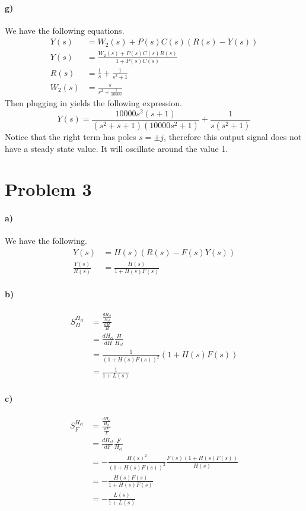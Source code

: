 \documentclass[12pt]{article}
\begin{document}
\paragraph{g)}

We have the following equations.
\begin{align*}
    Y(s)&=W_2(s)+P(s)C(s)(R(s)-Y(s))\\
    Y(s)&=\frac{W_2(s)+P(s)C(s)R(s)}{1+P(s)C(s)}\\
    R(s)&=\frac{1}{s}+\frac{1}{s^2+1}\\
    W_2(s)&=\frac{s}{s^2+\frac{1}{10000}}
\end{align*}
Then plugging in yields the following expression.
\[Y(s)=\frac{10000s^2(s+1)}{(s^2+s+1)(10000s^2+1)} + \frac{1}{s(s^2+1)}\]
Notice that the right term has poles \(s=\pm j\), therefore this output signal does
not have a steady state value. It will oscillate around the value 1.

\section*{Problem 3}

\paragraph{a)}

We have the following.
\begin{align*}
    Y(s)&=H(s)(R(s)-F(s)Y(s))\\
    \frac{Y(s)}{R(s)}&=\frac{H(s)}{1+H(s)F(s)}
\end{align*}

\paragraph{b)}

\begin{align*}
    S_H^{H_{cl}}&=\frac{\frac{dH_{cl}}{H_{cl}}}{\frac{dH}{H}}\\
    &=\frac{dH_{cl}}{dH}\frac{H}{H_{cl}}\\
    &=\frac{1}{(1+H(s)F(s))^2}(1+H(s)F(s))\\
    &=\frac{1}{1+L(s)}
\end{align*}

\paragraph{c)}

\begin{align*}
    S_F^{H_{cl}}&=\frac{\frac{dH_{cl}}{H_{cl}}}{\frac{dF}{F}}\\
    &=\frac{dH_{cl}}{dF}\frac{F}{H_{cl}}\\
    &=-\frac{H(s)^2}{(1+H(s)F(s))^2}\frac{F(s)(1+H(s)F(s))}{H(s)}\\
    &=-\frac{H(s)F(s)}{1+H(s)F(s)}\\
    &=-\frac{L(s)}{1+L(s)}
\end{align*}
\end{document}
